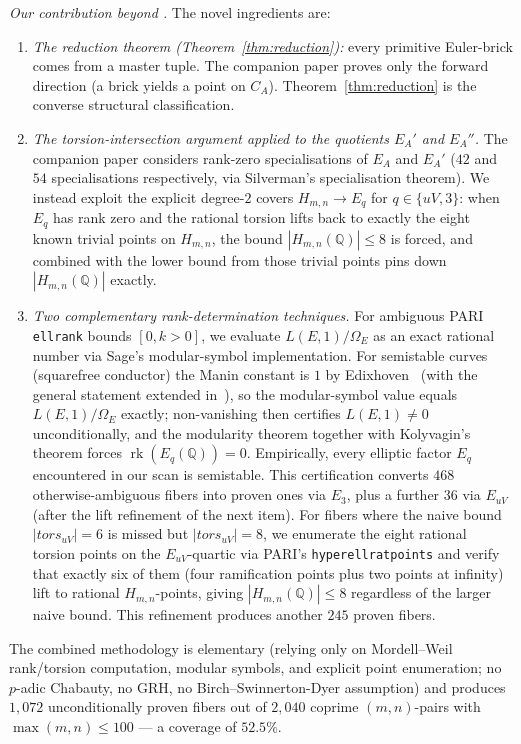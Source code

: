 \documentclass[12pt,a4paper,reqno]{amsart}
\theoremstyle{plain}
\theoremstyle{definition}
\theoremstyle{remark}
\newcommand{\Q}{\mathbb{Q}}
\newcommand{\HC}{H_{m,n}}
\newcommand{\rk}{\operatorname{rk}}
\begin{document}
\emph{Our contribution beyond \cite{peschmann-paper1}.} The novel ingredients are:
\begin{enumerate}[label=(\arabic*),leftmargin=2em]
    \item \emph{The reduction theorem (Theorem~\ref{thm:reduction}):} every primitive Euler-brick comes from a master tuple. The companion paper proves only the forward direction (a brick yields a point on $C_A$). Theorem~\ref{thm:reduction} is the converse structural classification.

    \item \emph{The torsion-intersection argument applied to the quotients $E_A'$ and $E_A''$.} The companion paper considers rank-zero specialisations of $E_A$ and $E_A'$ ($42$ and $54$ specialisations respectively, via Silverman's specialisation theorem). We instead exploit the explicit degree-$2$ covers $\HC \to E_q$ for $q \in \{uV, 3\}$: when $E_q$ has rank zero and the rational torsion lifts back to exactly the eight known trivial points on $\HC$, the bound $|\HC(\Q)| \le 8$ is forced, and combined with the lower bound from those trivial points pins down $|\HC(\Q)|$ exactly.

    \item \emph{Two complementary rank-determination techniques.} For ambiguous PARI \texttt{ellrank} bounds $[0, k>0]$, we evaluate $L(E, 1) / \Omega_E$ as an exact rational number via Sage's modular-symbol implementation. For semistable curves (squarefree conductor) the Manin constant is $1$ by Edixhoven~\cite{edixhoven-manin} (with the general statement extended in~\cite{cesnavicius-manin}), so the modular-symbol value equals $L(E,1)/\Omega_E$ exactly; non-vanishing then certifies $L(E, 1) \neq 0$ unconditionally, and the modularity theorem \cite{breuil-conrad-diamond-taylor} together with Kolyvagin's theorem \cite{kolyvagin} forces $\rk(E_q(\Q)) = 0$. Empirically, every elliptic factor $E_q$ encountered in our scan is semistable. This certification converts $468$ otherwise-ambiguous fibers into proven ones via $E_3$, plus a further $36$ via $E_{uV}$ (after the lift refinement of the next item). For fibers where the naive bound $|tors_{uV}| = 6$ is missed but $|tors_{uV}| = 8$, we enumerate the eight rational torsion points on the $E_{uV}$-quartic via PARI's \texttt{hyperellratpoints} and verify that exactly six of them (four ramification points plus two points at infinity) lift to rational $\HC$-points, giving $|\HC(\Q)| \le 8$ regardless of the larger naive bound. This refinement produces another $245$ proven fibers.
\end{enumerate}
The combined methodology is elementary (relying only on Mordell--Weil rank/torsion computation, modular symbols, and explicit point enumeration; no $p$-adic Chabauty, no GRH, no Birch--Swinnerton-Dyer assumption) and produces $1{,}072$ unconditionally proven fibers out of $2{,}040$ coprime $(m, n)$-pairs with $\max(m, n) \le 100$ — a coverage of $52.5\%$.
\end{document}

